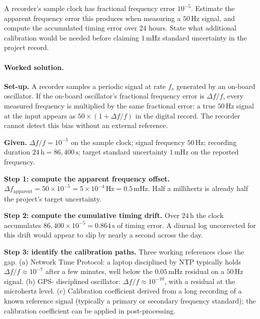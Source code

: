 \begin{exercise}
A recorder's sample clock has fractional frequency error $10^{-5}$.
Estimate the apparent frequency error this produces when measuring
a $50 \,\si{\hertz}$ signal, and compute the accumulated timing
error over 24 hours. State what additional calibration would be
needed before claiming $1 \,\si{\milli\hertz}$ standard
uncertainty in the project record.

\paragraph{Worked solution.}
\textbf{Set-up.} A recorder samples a periodic signal at rate
$f_{s}$ generated by an on-board oscillator. If the on-board
oscillator's fractional frequency error is $\Delta f/f$, every
measured frequency is multiplied by the same fractional error: a
true $50 \,\si{\hertz}$ signal at the input appears as
$50 \times (1 + \Delta f/f)$ in the digital record. The recorder
cannot detect this bias without an external reference.

\textbf{Given.} $\Delta f/f = 10^{-5}$ on the sample clock; signal
frequency $50 \,\si{\hertz}$; recording duration $24 \,\si{\hour}
= 86{,}400 \,\si{\second}$; target standard uncertainty $1 \,\si
{\milli\hertz}$ on the reported frequency.

\textbf{Step 1: compute the apparent frequency offset.}
$\Delta f_{\text{apparent}} = 50 \times 10^{-5} = 5 \times 10^{-4}
\,\si{\hertz} = 0.5 \,\si{\milli\hertz}$. Half a millihertz is
already half the project's target uncertainty.

\textbf{Step 2: compute the cumulative timing drift.} Over $24
\,\si{\hour}$ the clock accumulates $86{,}400 \times 10^{-5} =
0.864 \,\si{\second}$ of timing error. A diurnal log uncorrected
for this drift would appear to slip by nearly a second across the
day.

\textbf{Step 3: identify the calibration paths.} Three working
references close the gap. (a) Network Time Protocol: a
laptop disciplined by NTP typically holds $\Delta f/f \approx
10^{-7}$ after a few minutes, well below the $0.05 \,\si{\milli
\hertz}$ residual on a $50 \,\si{\hertz}$ signal. (b) GPS-
disciplined oscillator: $\Delta f/f \approx 10^{-10}$, with a
residual at the microhertz level. (c) Calibration coefficient
derived from a long recording of a known reference signal
(typically a primary or secondary frequency standard); the
calibration coefficient can be applied in post-processing.


\end{exercise}
